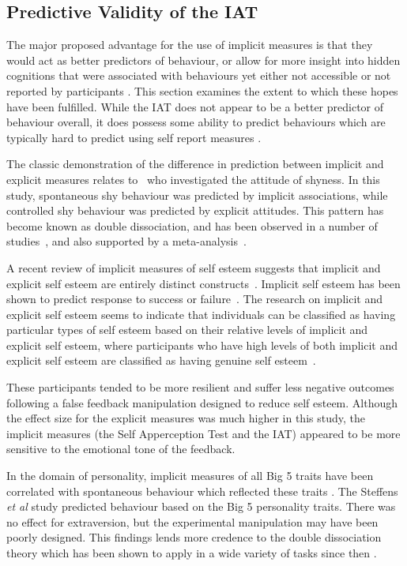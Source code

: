 \subsection{Predictive Validity of the IAT}
\label{sec:pred-valid-iat}


The major proposed advantage for the use of implicit measures is that they would act as better predictors of behaviour, or allow for more insight into hidden cognitions that were associated with behaviours yet either not accessible or not reported by participants \cite{Greenwald1998}. This section examines the extent to which these hopes have been fulfilled. While the IAT does not appear to be a better predictor of behaviour overall, it does possess some ability to predict behaviours which are typically hard to predict using self report measures \cite{Greenwald2009}. 

The classic demonstration of the difference in prediction between implicit and explicit measures relates to~\cite{Asendorpf2002} who investigated the attitude of shyness. In this study, spontaneous shy behaviour was predicted by implicit associations, while controlled shy behaviour was predicted by explicit attitudes. This pattern has become known as double dissociation, and has been observed in a number of studies~\cite{Perugini2005}, and also supported by  a meta-analysis~\cite{Hofmann2005}. 

A recent review of implicit measures of self esteem suggests that implicit and explicit self esteem are entirely distinct constructs~\cite{Rudolph2008}. Implicit self esteem has been shown to predict response to success or failure~\cite{Greenwald2000}. 
The research on implicit and explicit self esteem seems to indicate that individuals can be classified as having particular types of self esteem based on their relative levels of implicit and explicit self esteem, where participants who have high levels of both implicit and explicit self esteem are classified as having genuine self esteem~\cite{Meagher2004}. 

These participants tended to be more resilient and suffer less negative outcomes following a false feedback manipulation designed to reduce self esteem. Although the effect size for the explicit measures was much higher in this study, the implicit measures (the Self Apperception Test and the IAT) appeared to be more sensitive to the emotional tone of the feedback. 


In the domain of personality, implicit measures of all Big 5 traits have been correlated with spontaneous behaviour which reflected these traits \cite{Steffens2006}. 
The Steffens \textit{et al} study predicted behaviour based on the Big 5 personality traits. There was no effect for extraversion, but the experimental manipulation may have been poorly designed. This findings lends more credence to the double dissociation theory \cite{Asendorpf2002} which has been shown to apply in a wide variety of tasks since then \cite{Perugini2005,Conner2005}. 

